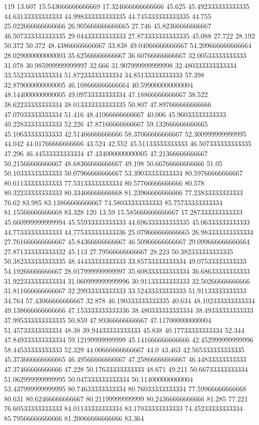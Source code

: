 119 13.607 15.543666666666669 17.324666666666666 45.625 45.492333333333335 44.63133333333333 44.998333333333335 44.745333333333335 44.755 25.022666666666666 26.905666666666665 27.746 45.82366666666667 46.507333333333335 29.04433333333333 27.873333333333335 45.088 27.722 28.192 50.372 50.372 48.43866666666667 33.838 49.04066666666667 54.209666666666664 28.029000000000003 35.62566666666667 36.60766666666667 32.00533333333333 31.078 30.985999999999997 32.666 31.907999999999998 32.480333333333334 33.55233333333334 51.87233333333334 34.85133333333333 57.398 32.879000000000005 46.108666666666664 40.599000000000004 48.144000000000005 49.09733333333334 47.18866666666667 38.522 38.62233333333334 38.013333333333335 50.807 47.897666666666666 47.07033333333334 51.416 48.41066666666667 40.006 45.96033333333333 40.22833333333333 52.226 47.87166666666667 59.132666666666665 45.10633333333333 42.51466666666666 58.37066666666667 52.300999999999995 44.042 44.01766666666666 43.524 42.552 45.51133333333333 46.507333333333335 47.296 46.44533333333334 47.434000000000005 47.21366666666667 50.21566666666667 48.68366666666667 49.198 50.66766666666666 51.05 50.10333333333333 50.07966666666667 53.39033333333334 80.59766666666667 80.61133333333333 77.53133333333334 80.57766666666666 80.578 80.32233333333333 80.33466666666668 81.23966666666666 77.23833333333333 76.62 83.985 83.13866666666667 74.58033333333333 85.75733333333334 81.15566666666668 83.328
120 13.59 15.585666666666667 17.287333333333333 45.660999999999994 45.55933333333333 44.696333333333335 45.06333333333333 44.77333333333333 44.775333333333336 25.079666666666665 26.983333333333334 27.761666666666667 45.84366666666667 46.50966666666667 29.099666666666664 27.871333333333332 45.113 27.79566666666667 28.223 50.382333333333335 50.382333333333335 48.44433333333333 33.85733333333334 49.07533333333333 54.19266666666667 28.017999999999997 35.608333333333334 36.68633333333333 31.922333333333334 31.060999999999996 30.91133333333333 32.50266666666666 31.811666666666667 32.29933333333333 33.52433333333333 51.91133333333333 34.764 57.43066666666667 32.878 46.190333333333335 40.634 48.102333333333334 49.138666666666666 47.153333333333336 38.480333333333334 38.49333333333333 37.995333333333335 50.859 47.89366666666667 47.117000000000004 51.45733333333334 48.38 39.94433333333333 45.838 40.17733333333334 52.344 47.849333333333334 59.12199999999999 45.141666666666666 42.452999999999996 58.44533333333333 52.329 44.00666666666667 44.0 43.463 42.565333333333335 45.373666666666665 46.49566666666667 47.25866666666667 46.44833333333333 47.37466666666666 47.228 50.17633333333333 48.671 49.211 50.66733333333334 51.062999999999995 50.047333333333334 50.114000000000004 53.437999999999995 80.74633333333334 80.76033333333334 77.59966666666668 80.631 80.62466666666667 80.21199999999999 80.24366666666666 81.285 77.221 76.60533333333333 84.01133333333334 83.17033333333333 74.45233333333334 85.79566666666666 81.20066666666666 83.364

